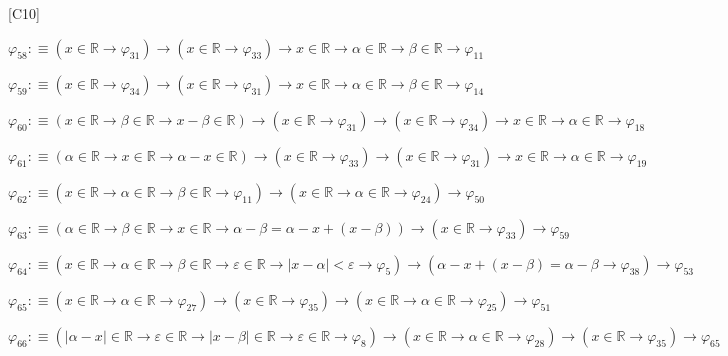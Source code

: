 \begin{fullproof}{[C10]}
\begin{abbrevlist}
\item $\varphi_{58} :\equiv (x \in \mathbb{R} \to \varphi_{31}) \to (x \in \mathbb{R} \to \varphi_{33}) \to x \in \mathbb{R} \to \alpha \in \mathbb{R} \to \beta \in \mathbb{R} \to \varphi_{11}$
\item $\varphi_{59} :\equiv (x \in \mathbb{R} \to \varphi_{34}) \to (x \in \mathbb{R} \to \varphi_{31}) \to x \in \mathbb{R} \to \alpha \in \mathbb{R} \to \beta \in \mathbb{R} \to \varphi_{14}$
\item $\varphi_{60} :\equiv (x \in \mathbb{R} \to \beta \in \mathbb{R} \to x - \beta \in \mathbb{R}) \to (x \in \mathbb{R} \to \varphi_{31}) \to (x \in \mathbb{R} \to \varphi_{34}) \to x \in \mathbb{R} \to \alpha \in \mathbb{R} \to \varphi_{18}$
\item $\varphi_{61} :\equiv (\alpha \in \mathbb{R} \to x \in \mathbb{R} \to \alpha - x \in \mathbb{R}) \to (x \in \mathbb{R} \to \varphi_{33}) \to (x \in \mathbb{R} \to \varphi_{31}) \to x \in \mathbb{R} \to \alpha \in \mathbb{R} \to \varphi_{19}$
\item $\varphi_{62} :\equiv (x \in \mathbb{R} \to \alpha \in \mathbb{R} \to \beta \in \mathbb{R} \to \varphi_{11}) \to (x \in \mathbb{R} \to \alpha \in \mathbb{R} \to \varphi_{24}) \to \varphi_{50}$
\item $\varphi_{63} :\equiv (\alpha \in \mathbb{R} \to \beta \in \mathbb{R} \to x \in \mathbb{R} \to \alpha - \beta = \alpha - x + (x - \beta)) \to (x \in \mathbb{R} \to \varphi_{33}) \to \varphi_{59}$
\item $\varphi_{64} :\equiv (x \in \mathbb{R} \to \alpha \in \mathbb{R} \to \beta \in \mathbb{R} \to \varepsilon \in \mathbb{R} \to \lvert x - \alpha \rvert < \varepsilon \to \varphi_{5}) \to (\alpha - x + (x - \beta) = \alpha - \beta \to \varphi_{38}) \to \varphi_{53}$
\item $\varphi_{65} :\equiv (x \in \mathbb{R} \to \alpha \in \mathbb{R} \to \varphi_{27}) \to (x \in \mathbb{R} \to \varphi_{35}) \to (x \in \mathbb{R} \to \alpha \in \mathbb{R} \to \varphi_{25}) \to \varphi_{51}$
\item $\varphi_{66} :\equiv (\lvert \alpha - x \rvert \in \mathbb{R} \to \varepsilon \in \mathbb{R} \to \lvert x - \beta \rvert \in \mathbb{R} \to \varepsilon \in \mathbb{R} \to \varphi_{8}) \to (x \in \mathbb{R} \to \alpha \in \mathbb{R} \to \varphi_{28}) \to (x \in \mathbb{R} \to \varphi_{35}) \to \varphi_{65}$
\end{abbrevlist}
\end{fullproof}
